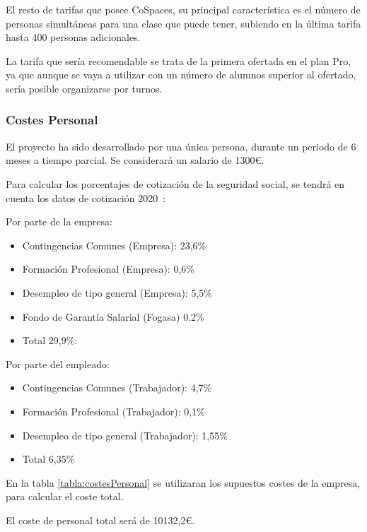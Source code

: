 El resto de tarifas que posee CoSpaces, su principal característica es el número de personas simultáneas para una clase que puede tener, subiendo en la última tarifa hasta 400 personas adicionales.

La tarifa que sería recomendable se trata de la primera ofertada en el plan Pro, ya que aunque se vaya a utilizar con un número de alumnos superior al ofertado, sería posible organizarse por turnos.

\subsubsection{Costes Personal}
El proyecto ha sido desarrollado por una única persona, durante un periodo de 6 meses a tiempo parcial. Se considerará un salario de 1300\euro.

Para calcular los porcentajes de cotización de la seguridad social, se tendrá en cuenta los datos de cotización 2020~\cite{contingencias2020}:

Por parte de la empresa:
\begin{itemize}
	\item Contingencias Comunes (Empresa): 23,6\%
	\item Formación Profesional (Empresa): 0,6\%
	\item Desempleo de tipo general (Empresa): 5,5\%
	\item Fondo de Garantía Salarial (Fogasa) 0.2\%
	\item Total 29,9\%:
\end{itemize}

Por parte del empleado:
\begin{itemize}
	\item Contingencias Comunes (Trabajador): 4,7\%	
	\item Formación Profesional (Trabajador): 0,1\%
	\item Desempleo de tipo general (Trabajador): 1,55\%
	\item Total 6,35\%
\end{itemize}

En la tabla \ref{tabla:costesPersonal} se utilizaran los supuestos costes de la empresa, para calcular el coste total.

El coste de personal total será de 10132,2\euro.


